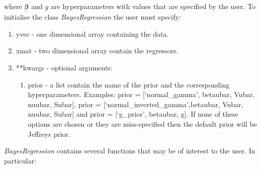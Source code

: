 \documentclass[article]{jss}
\begin{document}
where $\bm{\underline{\beta}}$ and $g$ are hyperparameters with
values that are specified by the user. To initialise the class \emph{BayesRegression}
the user must specify: 
\begin{enumerate}
\item yvec - one dimensional  array containing the data. 
\item xmat - two dimensional  array contain the regressors.
\item {*}{*}kwargs - optional arguments:

\begin{enumerate}
\item prior - a list contain the name of the prior and the
  corresponding hyperparameters. Examples: prior = {[}`normal\_gamma',
  betaubar, Vubar, nuubar, Subar{]},
  prior = {[}`normal\_inverted\_gamma',betaubar, Vubar, nuubar, Subar{]}
  and prior = {[}`g\_prior', betaubar, g{]}. If none of these options
  are chosen or they are miss-specified then the default prior will be
  Jeffreys prior.
\end{enumerate}
\end{enumerate}
\emph{BayesRegression }contains several functions that may be of interest
to the user. In particular: 
\end{document}
